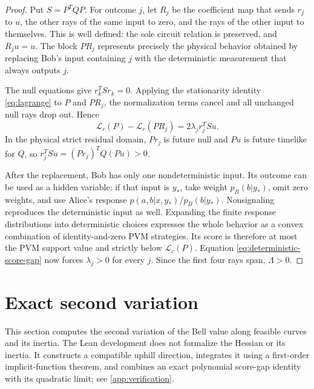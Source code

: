 \documentclass[11pt]{article}
\theoremstyle{definition}
\begin{document}
\begin{proof}
Put \(S=P^TQP\). For outcome \(j\), let \(R_j\) be the coefficient map
that sends \(r_j\) to \(u\), the other rays of the same input to zero,
and the rays of the other input to themselves. This is well defined:
the sole circuit relation is preserved, and \(R_ju=u\).
The block \(PR_j\) represents precisely the physical behavior obtained by
replacing Bob's input containing \(j\) with the deterministic measurement
that always outputs \(j\).

The null equations give \(r_k^TSr_k=0\). Applying the stationarity
identity \eqref{eq:lagrange} to \(P\) and \(PR_j\), the normalization
terms cancel and all unchanged null rays drop out. Hence
\begin{equation}
\label{eq:deterministic-score-gap}
\mathcal L_c(P)-\mathcal L_c(PR_j)
=2\lambda_j r_j^TSu.
\end{equation}
In the physical strict residual domain, \(Pr_j\) is future null and
\(Pu\) is future timelike for \(Q\), so
\(r_j^TSu=(Pr_j)^TQ(Pu)>0\).

After the replacement, Bob has only one nondeterministic input. Its
outcome can be used as a hidden variable: if that input is \(y_*\), take
weight \(p_B(b|y_*)\), omit zero weights, and use Alice's response
\(p(a,b|x,y_*)/p_B(b|y_*)\). Nonsignaling reproduces the deterministic
input as well. Expanding the finite response distributions into
deterministic choices expresses the whole behavior as a convex combination
of identity-and-zero PVM strategies. Its score is therefore at most the
PVM support value and strictly below \(\mathcal L_c(P)\).
Equation \eqref{eq:deterministic-score-gap} now forces \(\lambda_j>0\)
for every \(j\). Since the first four rays span, \(\Lambda>0\).
\end{proof}

\section{Exact second variation}
\label{sec:second-variation}

This section computes the second variation of the Bell value along
feasible curves and its inertia. The Lean development does not formalize
the Hessian or its inertia. It constructs a compatible uphill direction,
integrates it using a first-order implicit-function theorem, and combines
an exact polynomial score-gap identity with its quadratic limit; see
\cref{app:verification}.
\end{document}
